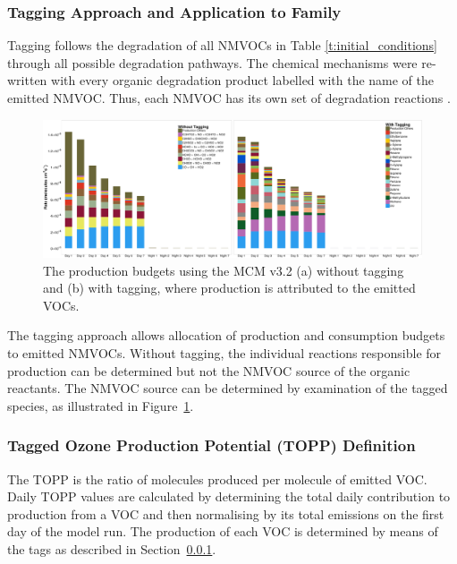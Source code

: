 \subsubsection[Tagging Approach and Application to Ox Family]{Tagging Approach and Application to  Family} \label{ss:tagging} %

Tagging follows the degradation of all NMVOCs in Table \ref{t:initial_conditions} through all possible degradation pathways. 
The chemical mechanisms were re-written with every organic degradation product labelled with the name of the emitted NMVOC. 
Thus, each NMVOC has its own set of degradation reactions \citep{Butler:2011}. 

\begin{figure}
    \begin{center}
        \includegraphics[width=\textwidth]{img/MCMv3_2_Ox_production_budgets}
        \caption{The  production budgets using the MCM v3.2 (a) without tagging and (b) with tagging, where  production is attributed to the emitted VOCs.}
        \label{f:Ox_budget}
    \end{center}
\end{figure} 

The tagging approach allows allocation of production and consumption budgets to emitted NMVOCs. 
Without tagging, the individual reactions responsible for  production can be determined but not the NMVOC source of the organic reactants. 
The NMVOC source can be determined by examination of the tagged species, as illustrated in \mbox{Figure \ref{f:Ox_budget}}.

\subsubsection{Tagged Ozone Production Potential (TOPP) Definition} %

The TOPP is the ratio of  molecules produced per molecule of emitted VOC.  
Daily TOPP values are calculated by determining the total daily contribution to  production from a VOC and then normalising by its total emissions on the first day of the model run. 
The  production of each VOC is determined by means of the tags as described in \mbox{Section \ref{ss:tagging}}. 
